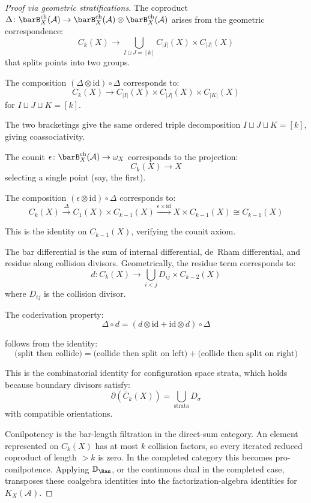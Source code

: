 \begin{proof}[Proof via geometric stratifications]
The coproduct
$\Delta\colon\barB_X^{\mathrm{ch}}(\mathcal{A})\to
\barB_X^{\mathrm{ch}}(\mathcal{A})\otimes
\barB_X^{\mathrm{ch}}(\mathcal{A})$
arises from the geometric correspondence:
\[C_k(X) \to \bigcup_{I \sqcup J = [k]} C_{|I|}(X) \times C_{|J|}(X)\]
that splits points into two groups.

The composition $(\Delta \otimes \text{id}) \circ \Delta$ corresponds to:
\[C_k(X) \to C_{|I|}(X) \times C_{|J|}(X) \times C_{|K|}(X)\]
for $I \sqcup J \sqcup K = [k]$.

The two bracketings give the same ordered triple decomposition
$I \sqcup J \sqcup K=[k]$, giving coassociativity.

The counit
$\epsilon\colon\barB_X^{\mathrm{ch}}(\mathcal{A})\to\omega_X$
corresponds to the projection:
\[C_k(X) \to X\]
selecting a single point (say, the first).

The composition $(\epsilon \otimes \text{id}) \circ \Delta$ corresponds to:
\[C_k(X) \xrightarrow{\Delta} C_1(X) \times C_{k-1}(X) \xrightarrow{\epsilon \times \text{id}} X \times C_{k-1}(X) \cong C_{k-1}(X)\]

This is the identity on $C_{k-1}(X)$, verifying the counit axiom.

The bar differential is the sum of internal differential, de~Rham
differential, and residue along collision divisors. Geometrically,
the residue term corresponds to:
\[d: C_k(X) \to \bigcup_{i<j} D_{ij} \times C_{k-2}(X)\]
where $D_{ij}$ is the collision divisor.

The coderivation property:
\[\Delta \circ d = (d \otimes \text{id} + \text{id} \otimes d) \circ \Delta\]

follows from the identity:
\[\text{(split then collide)} = \text{(collide then split on left)} + \text{(collide then split on right)}\]

This is the combinatorial identity for configuration space strata, which holds because boundary divisors satisfy:
\[\partial(\overline{C}_k(X)) = \bigcup_{\text{strata}} D_{\sigma}\]
with compatible orientations.

Conilpotency is the bar-length filtration in the direct-sum
category. An element represented on $C_k(X)$ has at most $k$
collision factors, so every iterated reduced coproduct of length
$>k$ is zero. In the completed category this becomes
pro-conilpotence. Applying $\mathbb{D}_{\Ran}$, or the continuous
dual in the completed case, transposes these coalgebra identities into
the factorization-algebra identities for $K_X(\mathcal A)$.
\end{proof}

